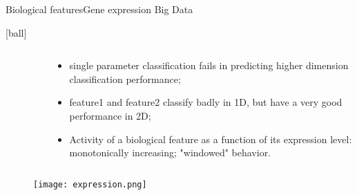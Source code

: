 \documentclass{standalone}
\begin{document}
\begin{frame}{Biological features}{Gene expression Big Data}

  [ball]

  \begin{columns}

    \begin{column}{0.4\linewidth}

      \begin{figure}[htbp]
        \centering
        \def\svgwidth{0.8\linewidth}
        
      \end{figure}

    \end{column}
    \begin{column}{0.6\linewidth}

      \begin{itemize}
        \item single parameter classification fails in predicting higher dimension classification performance;

        \item feature1 and feature2 classify badly in 1D, but have a very good performance in 2D;

        \item Activity of a biological feature as a function of its expression level: monotonically increasing; "windowed" behavior.

      \end{itemize}

    \end{column}
  \end{columns}

  \begin{figure}[htbp]
    \centering
    \texttt{[image: expression.png]}
  \end{figure}

\end{frame}
\end{document}
